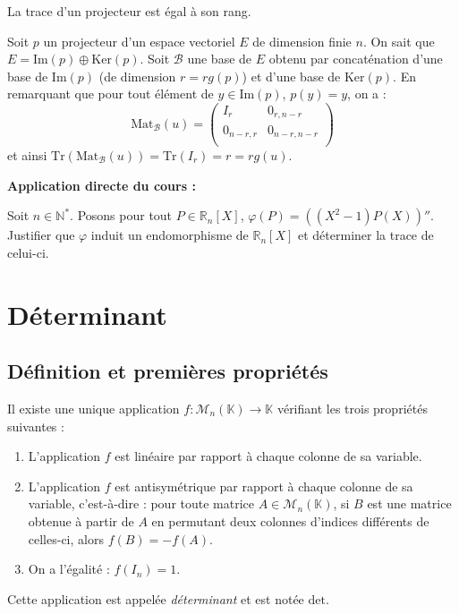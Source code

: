 \documentclass[french,11pt,twoside]{VcCours}
\newenvironment{ApplicationDirecte}{\textbf{Application directe du cours :}

}{}
\begin{document}
\medskip

\begin{Exemple} La trace d'un projecteur est égal à son rang.


\newpage
\vspace*{5cm}
\medskip

Soit $p$ un projecteur d'un espace vectoriel $E$ de dimension finie $n$. On sait que $E = \textrm{Im}(p) \oplus \textrm{Ker}(p)$. Soit $\mathcal{B}$ une base de $E$ obtenu par concaténation d'une base de $\textrm{Im}(p)$ (de dimension $r= rg(p)$) et d'une base de $\textrm{Ker}(p)$. En remarquant que pour tout élément de $y \in \textrm{Im}(p)$, $p(y)=y$, on a :
$$ \textrm{Mat}_{\mathcal{B}}(u) = \begin{pmatrix}
I_r & 0_{r,n-r} \\
0_{n-r,r}& 0_{n-r,n-r} \\
\end{pmatrix}$$
et ainsi $\textrm{Tr}(\textrm{Mat}_{\mathcal{B}}(u)) = \textrm{Tr}(I_r)= r = rg(u)$.
\end{Exemple}

\begin{ApplicationDirecte} Soit $n \in \mathbb{N}^*$. Posons pour tout $P \in \mathbb{R}_n[X]$, $\varphi(P) = ((X^2-1)P(X))''$. Justifier que $\varphi$ induit un endomorphisme de $\mathbb{R}_n[X]$ et déterminer la trace de celui-ci.
\end{ApplicationDirecte}

\section{Déterminant}

\subsection{Définition et premières propriétés}

\begin{Definition}{} Il existe une unique application $f : \mathcal{M}_n(\mathbb{K}) \rightarrow \mathbb{K}$ vérifiant les trois propriétés suivantes :

\begin{enumerate}
\item L'application $f$ est linéaire par rapport à chaque colonne de sa variable.
\item L'application $f$ est antisymétrique par rapport à chaque colonne de sa variable, c'est-à-dire : pour toute matrice $A \in \mathcal{M}_n(\mathbb{K})$, si $B$ est une matrice obtenue à partir de $A$ en permutant deux colonnes d'indices différents de celles-ci, alors $f(B)=-f(A)$.
\item On a l'égalité : $f(I_n)=1$.
\end{enumerate}

Cette application est appelée \emph{déterminant} et est notée $\textrm{det}$.
\end{Definition}
\end{document}

